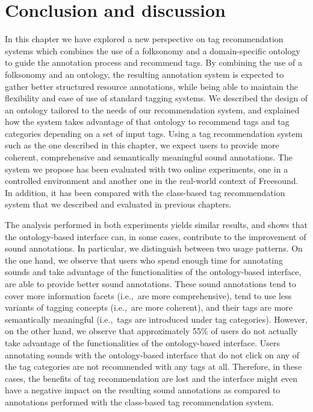 \section{Conclusion and discussion}
\label{sec:ontology:conclusion}

In this chapter we have explored a new perspective on tag recommendation systems which combines the use of a folksonomy and a domain-specific ontology to guide the annotation process and recommend tags.
By combining the use of a folksonomy and an ontology, the resulting annotation system is expected to gather better structured resource annotations, while being able to maintain the flexibility and ease of use of standard tagging systems.
We described the design of an ontology tailored to the needs of our recommendation system, and explained how the system takes advantage of that ontology to recommend tags and tag categories depending on a set of input tags.
Using a tag recommendation system such as the one described in this chapter, we expect users to provide more coherent, comprehensive and semantically meaningful sound annotations.
The system we propose has been evaluated with two online experiments, one in a controlled environment and another one in the real-world context of Freesound. In addition, it has been compared with the class-based tag recommendation system that we described and evaluated in previous chapters.

The analysis performed in both experiments yields similar results, and shows that the ontology-based interface can, in some cases, contribute to the improvement of sound annotations.
In particular, we distinguish between two usage patterns. 
On the one hand, we observe that users who spend enough time for annotating sounds and take advantage of the functionalities of the ontology-based interface, are able to provide better sound annotations. These sound annotations tend to cover more information facets (i.e.,~are more comprehensive), tend to use less variants of tagging concepts (i.e.,~are more coherent), and their tags are more semantically meaningful (i.e.,~tags are introduced under tag categories).
However, on the other hand, we observe that approximately 55\% of users do not actually take advantage of the functionalities of the ontology-based interface. 
Users annotating sounds with the ontology-based interface that do not click on any of the tag categories are not recommended with any tags at all. 
Therefore, in these cases, the benefits of tag recommendation are lost and the interface might even have a negative impact on the resulting sound annotations as compared to annotations performed with the class-based tag recommendation system.

